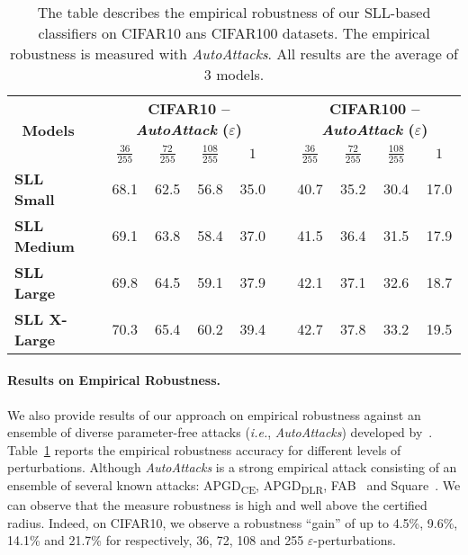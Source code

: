 \documentclass{article} \usepackage{iclr2023_conference,times}
\newcommand{\0}{\mathbf{0} }
\newcommand{\ie}{\textit{i.e.}\xspace}
\begin{document}
\begin{table}[t]
  \centering
  {
  \caption{The table describes the empirical robustness of our SLL-based classifiers on CIFAR10 ans CIFAR100 datasets. The empirical robustness is measured with  \textit{AutoAttacks}. All results are
the average of 3 models.}
  \label{tab:autoattack}\begin{tabular}{lrccccccccc}
    \toprule
    \multicolumn{1}{c}{\multirow{2}[4]{*}{\textbf{Models}}} &   & \multicolumn{4}{c}{\textbf{CIFAR10 -- \textit{AutoAttack} ($\varepsilon$)}} &   & \multicolumn{4}{c}{\textbf{CIFAR100 -- \textit{AutoAttack} ($\varepsilon$)}} \\
\cmidrule{3-6}\cmidrule{8-11}      &   & $\frac{36}{255}$ & $\frac{72}{255}$ & $\frac{108}{255}$ & $1$ &   & $\frac{36}{255}$ & $\frac{72}{255}$ & $\frac{108}{255}$ & $1$ \\
    \midrule
    \textbf{SLL Small}   &   & 68.1 & 62.5 & 56.8 & 35.0 &   & 40.7 & 35.2 & 30.4 & 17.0 \\
    \textbf{SLL Medium}  &   & 69.1 & 63.8 & 58.4 & 37.0 &   & 41.5 & 36.4 & 31.5 & 17.9 \\
    \textbf{SLL Large}   &   & 69.8 & 64.5 & 59.1 & 37.9 &   & 42.1 & 37.1 & 32.6 & 18.7 \\
    \textbf{SLL X-Large} &   & 70.3 & 65.4 & 60.2 & 39.4 &   & 42.7 & 37.8 & 33.2 & 19.5 \\
    \bottomrule
    \end{tabular}}
\end{table}

\vspace{-0.0cm}
\paragraph{Results on Empirical Robustness.}
We also provide results of our approach on empirical robustness against an ensemble of diverse parameter-free attacks (\ie, \textit{AutoAttacks}) developed by~\cite{croce2020reliable}.
Table~\ref{tab:autoattack} reports the empirical robustness accuracy for different levels of perturbations.
Although \textit{AutoAttacks} is a strong empirical attack consisting of an ensemble of several known attacks:  APGD\textsubscript{CE}, APGD\textsubscript{DLR}, FAB~\citep{croce2020minimally} and Square~\citep{andriushchenko2020square}.
We can observe that the measure robustness is high and well above the certified radius. Indeed, on CIFAR10, we observe a robustness ``gain'' of up to 4.5\%, 9.6\%, 14.1\% and 21.7\% for respectively, 36, 72, 108 and 255 $\varepsilon$-perturbations.
\end{document}
